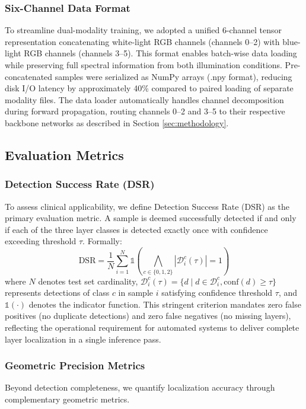 \subsubsection{Six-Channel Data Format} To streamline dual-modality training, we adopted a unified 6-channel tensor representation concatenating white-light RGB channels (channels 0--2) with blue-light RGB channels (channels 3--5). This format enables batch-wise data loading while preserving full spectral information from both illumination conditions. Pre-concatenated samples were serialized as NumPy arrays (.npy format), reducing disk I/O latency by approximately 40\% compared to paired loading of separate modality files. The data loader automatically handles channel decomposition during forward propagation, routing channels 0--2 and 3--5 to their respective backbone networks as described in Section \ref{sec:methodology}.

\subsection{Evaluation Metrics}

\subsubsection{Detection Success Rate (DSR)} To assess clinical applicability, we define Detection Success Rate (DSR) as the primary evaluation metric. A sample is deemed successfully detected if and only if each of the three layer classes is detected exactly once with confidence exceeding threshold $\tau$. Formally:
\begin{equation}
\text{DSR} = \frac{1}{N}\sum_{i=1}^{N}\mathbb{1}\left(\bigwedge_{c \in \{0,1,2\}} |\mathcal{D}_i^c(\tau)| = 1\right)
\end{equation}
where $N$ denotes test set cardinality, $\mathcal{D}_i^c(\tau) = \{d \mid d \in \mathcal{D}_i^c, \text{conf}(d) \geq \tau\}$ represents detections of class $c$ in sample $i$ satisfying confidence threshold $\tau$, and $\mathbb{1}(\cdot)$ denotes the indicator function. This stringent criterion mandates zero false positives (no duplicate detections) and zero false negatives (no missing layers), reflecting the operational requirement for automated systems to deliver complete layer localization in a single inference pass.

\subsubsection{Geometric Precision Metrics} Beyond detection completeness, we quantify localization accuracy through complementary geometric metrics. 

